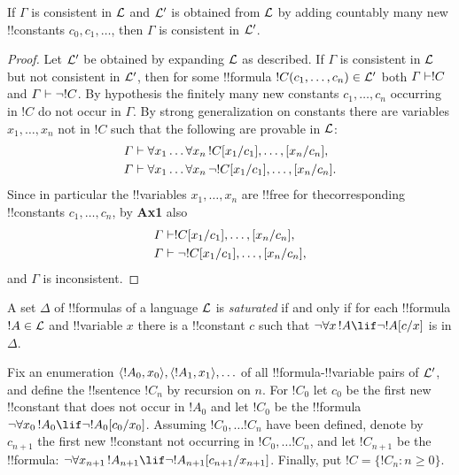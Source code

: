 \documentclass[../../include/open-logic-section]{subfiles}
\begin{document}
\begin{lem}
  If $\Gamma$ is consistent in  $\mathcal L$ and  $\mathcal L'$ is
  obtained from  $\mathcal L$ by adding countably many new !!{constants}
  $c_0, c_1, \ldots$, then $\Gamma$ is consistent in  $\mathcal L'$.
\end{lem}

\begin{proof}
  Let $\mathcal L'$ be obtained by expanding $\mathcal L$ as
  described.  If $\Gamma$ is consistent in $\mathcal L$ but not
  consistent in $\mathcal L'$, then for some !!{formula}
  $!C(c_1,\ldots,c_n) \in \mathcal L' $ both $\Gamma \Proves
  !C$ and $\Gamma \Proves \lnot !C$. By hypothesis the
  finitely many new constants $c_1,\ldots,c_n$ occurring in $!C$
  do not occur in $\Gamma$. By strong generalization on constants
  there are variables $x_1,\ldots,x_n$ not in $!C$ such that the
  following are provable in $\mathcal L$:
  \begin{align*}
& \Gamma \Proves \lforall[x_1]\ldots
\lforall[x_n][\Subst{!C}{x_1}{c_1},\ldots,\Subst{}{x_n}{c_n}], \\
& \Gamma \Proves \lforall[x_1]\ldots \lforall[x_n][\lnot
\Subst{!C}{x_1}{c_1},\ldots,\Subst{}{x_n}{c_n}].
  \end{align*}
Since in particular the !!{variable}s $x_1,\ldots,x_n$ are !!{free for}
thecorresponding !!{constant}s $c_1,\ldots,c_n$, by \textbf{Ax1} also
\begin{align*}
   & \Gamma \Proves \Subst{!C}{x_1}{c_1},\ldots,\Subst{}{x_n}{c_n}, \\
    & \Gamma \Proves \lnot \Subst{!C}{x_1}{c_1},\ldots,\Subst{}{x_n}{c_n},
  \end{align*}
and $\Gamma$ is inconsistent.
\end{proof}

\begin{defn}
  A set $\Delta$ of !!{formula}s of a language $\mathcal L$ is
  \emph{saturated} if and only if for each !!{formula} $!A \in
  \mathcal L$ and !!{variable} $x$ there is a !!{constant} $c$ such that
  $\lnot \lforall[x][!A] \lif \lnot \Subst{!A}{c}{x}$ is in
  $\Delta$.
\end{defn}

\begin{defn}\label{def:Theta}
  Fix an enumeration $\langle !A_0, x_0 \rangle,\langle !A_1,
  x_1 \rangle,\ldots$ of all !!{formula}-!!{variable} pairs of $\mathcal L'$,
  and define the !!{sentence} $!C_n$ by recursion on $n$. For
  $!C_0$ let $c_0$ be the first new !!{constant} that does not occur
  in $!A_0$ and let $!C_0$ be the !!{formula} $\lnot \lforall [x_0]
  [!A_0 \lif \lnot \Subst{!A_0}{c_0}{x_0}]$. Assuming
  $!C_0,\ldots!C_n$ have been defined, denote by $c_{n+1}$ the
  first new !!{constant} not occurring in $!C_0,\ldots!C_n$, and
  let $!C_{n+1}$ be the !!{formula}: $\lnot \lforall[x_{n+1}]
  [!A_{n+1}] \lif \lnot
  \Subst{!A_{n+1}}{c_{n+1}}{x_{n+1}}$. Finally, put $!C =
  \{!C_n : n \ge 0 \}$.
\end{defn}
\end{document}
